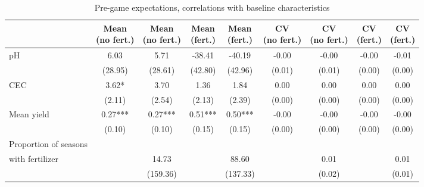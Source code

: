 \begin{table}[htbp]
\centering
\hspace*{-1.2cm}
\begin{threeparttable}
\caption{Pre-game expectations, correlations with baseline characteristics}
\label{tab:exppastchar}
\begin{tabular}{l cccccccc}
\hline
\hline
                    &\shortstack{Mean\\ (no fert.)}   &\shortstack{Mean\\ (no fert.)}   &\shortstack{Mean\\ (fert.)}   &\shortstack{Mean\\ (fert.)}   &\shortstack{CV\\ (no fert.)}   &\shortstack{CV\\ (no fert.)}   &\shortstack{CV\\ (fert.)}   &\shortstack{CV\\ (fert.)}   \\
\hline
pH                  &        6.03   &        5.71   &      -38.41   &      -40.19   &       -0.00   &       -0.00   &       -0.00   &       -0.01   \\
                    &     (28.95)   &     (28.61)   &     (42.80)   &     (42.96)   &      (0.01)   &      (0.01)   &      (0.00)   &      (0.00)   \\
CEC                 &        3.62*  &        3.70   &        1.36   &        1.84   &        0.00   &        0.00   &        0.00   &        0.00   \\
                    &      (2.11)   &      (2.54)   &      (2.13)   &      (2.39)   &      (0.00)   &      (0.00)   &      (0.00)   &      (0.00)   \\
Mean yield          &        0.27***&        0.27***&        0.51***&        0.50***&       -0.00   &       -0.00   &       -0.00   &       -0.00   \\
                    &      (0.10)   &      (0.10)   &      (0.15)   &      (0.15)   &      (0.00)   &      (0.00)   &      (0.00)   &      (0.00)   \\
Proportion of seasons\\ with fertilizer&               &       14.73   &               &       88.60   &               &        0.01   &               &        0.01   \\
                    &               &    (159.36)   &               &    (137.33)   &               &      (0.02)   &               &      (0.01)   \\

\end{tabular}
\end{threeparttable}
\end{table}
